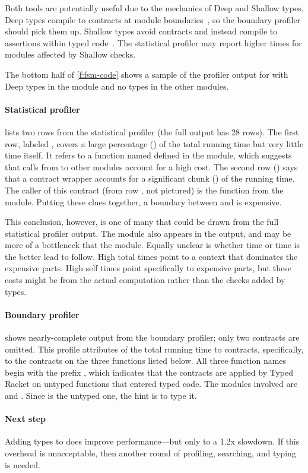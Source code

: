 Both tools are potentially useful due to the mechanics of Deep and Shallow types.
Deep types compile to contracts at module boundaries~\cite{tf-popl-2008}, so
the boundary profiler should pick them up.
Shallow types avoid contracts and instead compile to assertions within typed
code~\cite{glfd-pj-2022}.
The statistical profiler may report higher times for modules affected by Shallow checks.

The bottom half of \cref{f:fsm-code} shows a sample of the profiler output for
 with Deep types in the  module and no types in the
other modules.

\paragraph{Statistical profiler}

 lists two rows from the statistical profiler
(the full output has 28 rows).
The first row, labeled \code{[17]}, covers a large percentage ()
of the total running time but very little time itself.
It refers to a function named  defined in the  module,
which suggests that calls from  to other modules account for a
high cost.
The second row (\code{[24]}) says that a contract wrapper accounts for a
significant chunk () of the running time.
The caller of this contract (from row \code{[19]}, not pictured) is the
function  from the  module.
Putting these clues together, a boundary between  and 
is expensive.

This conclusion, however, is one of many that could be drawn from the
full statistical profiler output.
The  module also appears in the output, and may be more
of a bottleneck that the  module.
Equally unclear is whether  time or  time is the
better lead to follow.
High total times point to a context that dominates the expensive parts.
High self times point specifically to expensive parts, but these costs
might be from the actual computation rather than the checks added by types.

\paragraph{Boundary profiler}

 shows nearly-complete output from the boundary
profiler; only two contracts are omitted.
This profile attributes  of the total running time to contracts,
specifically, to the contracts on the three functions listed below.
All three function names begin with the prefix , which indicates
that the contracts are applied by Typed Racket on untyped functions that entered
typed code.
The modules involved are  and .
Since  is the untyped one, the hint is to type it.

\paragraph{Next step}

Adding types to  does improve performance---but only to a 1.2x slowdown.
If this overhead is unacceptable, then another round of profiling, searching, and typing is needed.


